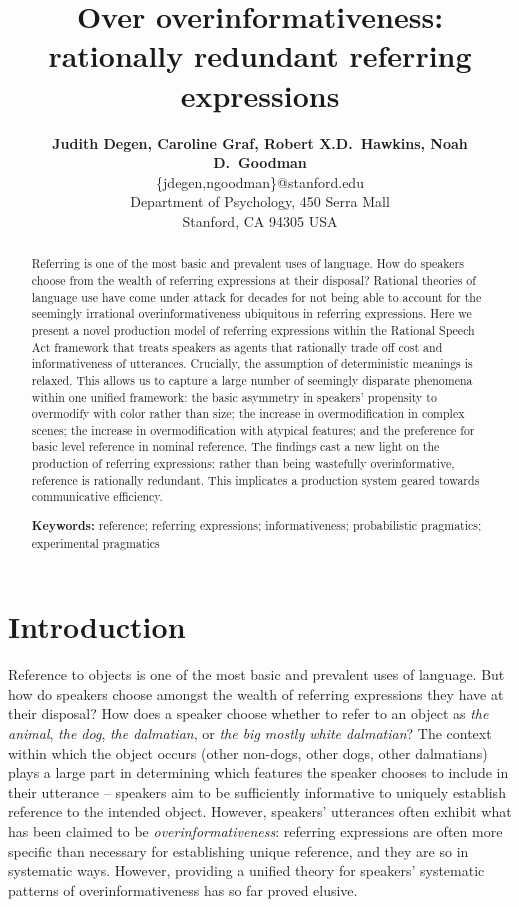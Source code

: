 \documentclass[11pt]{article}
\title{Over overinformativeness: rationally redundant referring expressions}
\author{{\large \bf Judith Degen, Caroline Graf, Robert X.D.~Hawkins, Noah D.~Goodman} \\
  \{jdegen,ngoodman\}@stanford.edu\\
  Department of Psychology, 450 Serra Mall \\
  Stanford, CA 94305 USA}
\begin{document}
\maketitle


\begin{abstract}
Referring is one of the most basic and prevalent uses of language. How do speakers choose from the wealth of referring expressions at their disposal? Rational theories of language use have come under attack for decades for not being able to account for the seemingly irrational overinformativeness ubiquitous in referring expressions. Here we present a novel production model of referring expressions within the Rational Speech Act framework that treats speakers as agents that rationally trade off cost and informativeness of utterances. Crucially, the assumption of deterministic meanings is relaxed. This allows us to capture a large number of seemingly disparate phenomena within one unified framework: the basic asymmetry in speakers' propensity to overmodify with color rather than size; the increase in overmodification in complex scenes; the increase in overmodification with atypical features; and the preference for basic level reference in nominal reference. The findings cast a new light on the production of referring expressions: rather than being wastefully overinformative, reference is rationally redundant. This implicates a production system geared towards communicative efficiency.

\textbf{Keywords:} 
reference; referring expressions; informativeness; probabilistic pragmatics; experimental pragmatics
\end{abstract}

\tableofcontents

\section{Introduction}
\label{sec:intro}

Reference to objects is one of the most basic and prevalent uses of language. But how do speakers choose amongst the wealth of referring expressions they have at their disposal? How does a speaker choose whether to refer to an object as \emph{the animal}, \emph{the dog}, \emph{the dalmatian}, or \emph{the big mostly white dalmatian}? The context within which the object occurs  (other non-dogs, other dogs, other dalmatians) plays a large part in determining which features the speaker chooses to include in their utterance  -- speakers aim to be sufficiently informative to uniquely establish reference to the intended object. However, speakers' utterances often exhibit what has been claimed to be \emph{overinformativeness}: referring expressions are often more specific than necessary for establishing unique reference, and they are so in systematic ways. However, providing a unified theory for speakers' systematic patterns of overinformativeness has so far proved elusive.
\end{document}
